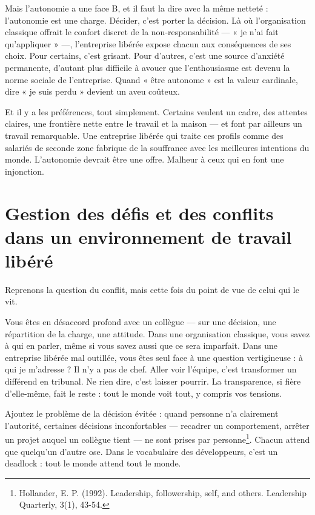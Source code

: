 Mais l'autonomie a une face B, et il faut la dire avec la même netteté : l'autonomie est une charge. Décider, c'est porter la décision. Là où l'organisation classique offrait le confort discret de la non-responsabilité — « je n'ai fait qu'appliquer » —, l'entreprise libérée expose chacun aux conséquences de ses choix. Pour certains, c'est grisant. Pour d'autres, c'est une source d'anxiété permanente, d'autant plus difficile à avouer que l'enthousiasme est devenu la norme sociale de l'entreprise. Quand « être autonome » est la valeur cardinale, dire « je suis perdu » devient un aveu coûteux.

Et il y a les préférences, tout simplement. Certains veulent un cadre, des attentes claires, une frontière nette entre le travail et la maison — et font par ailleurs un travail remarquable. Une entreprise libérée qui traite ces profils comme des salariés de seconde zone fabrique de la souffrance avec les meilleures intentions du monde. L'autonomie devrait être une offre. Malheur à ceux qui en font une injonction.

\section{Gestion des défis et des conflits dans un environnement de travail libéré}

Reprenons la question du conflit, mais cette fois du point de vue de celui qui le vit.

Vous êtes en désaccord profond avec un collègue — sur une décision, une répartition de la charge, une attitude. Dans une organisation classique, vous savez à qui en parler, même si vous savez aussi que ce sera imparfait. Dans une entreprise libérée mal outillée, vous êtes seul face à une question vertigineuse : à qui je m'adresse ? Il n'y a pas de chef. Aller voir l'équipe, c'est transformer un différend en tribunal. Ne rien dire, c'est laisser pourrir. La transparence, si fière d'elle-même, fait le reste : tout le monde voit tout, y compris vos tensions.

Ajoutez le problème de la décision évitée : quand personne n'a clairement l'autorité, certaines décisions inconfortables — recadrer un comportement, arrêter un projet auquel un collègue tient — ne sont prises par personne\footnote{Hollander, E. P. (1992). Leadership, followership, self, and others. Leadership Quarterly, 3(1), 43-54.}. Chacun attend que quelqu'un d'autre ose. Dans le vocabulaire des développeurs, c'est un deadlock : tout le monde attend tout le monde.

